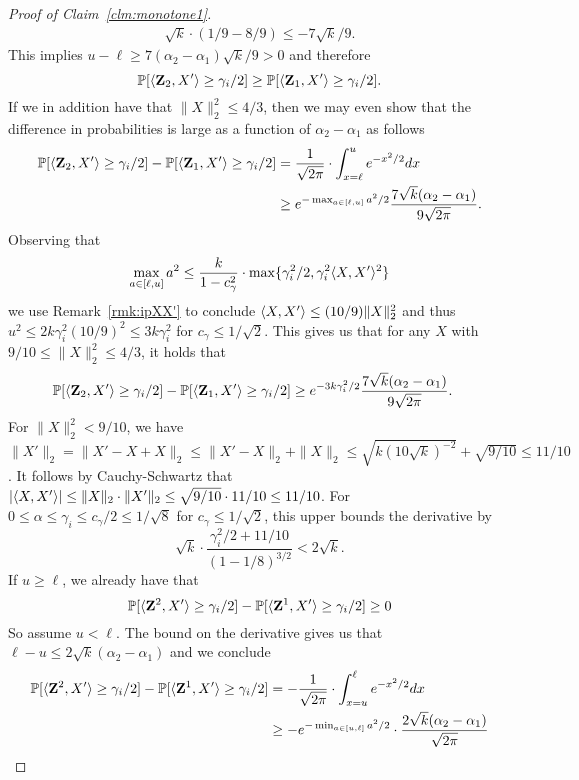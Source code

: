 \begin{proof}[Proof of Claim~\ref{clm:monotone1}]
\begin{align*}
    \sqrt{k} \cdot (1/9 - 8/9) \leq -7\sqrt{k}/9.
\end{align*}
This implies $u - \ell \geq 7(\alpha_2-\alpha_1) \sqrt{k}/9 > 0$ and therefore 
\[
\mathbb{P}[\langle\mathbf{Z}_2,X'\rangle\geq \gamma_i/2] \geq \mathbb{P}[\langle\mathbf{Z}_1,X'\rangle\geq \gamma_i/2].
\]
If we in addition have that $\|X\|_2^2 \leq 4/3$, then we may even show that the difference in probabilities is large as a function of $\alpha_2-\alpha_1$ as follows
\begin{align*}
    \mathbb{P}[\langle\mathbf{Z}_2,X'\rangle\geq \gamma_i/2] - \mathbb{P}[\langle\mathbf{Z}_1,X'\rangle\geq \gamma_i/2] &=\frac{1}{\sqrt{2 \pi}} \cdot \int_{x=\ell}^u e^{-x^2/2} dx \\
    &\geq e^{-\max_{a \in [\ell ,u]} a^2/2} \frac{7 \sqrt{k} (\alpha_2-\alpha_1)}{9 \sqrt{2 \pi}}.
\end{align*}
Observing that
\[
\max_{a \in [\ell, u]} a^2 \leq \frac{k}{1-c_\gamma^2} \cdot \max\{\gamma^2_i/2, \gamma_i^2 \langle X,X'\rangle^2\}
\]
we use Remark~\ref{rmk:ipXX'} to conclude $\langle X,X'\rangle \leq (10/9)\|X\|_2^2$ and thus $u^2 \leq 2k \gamma_i^2 (10/9)^2 \leq 3k \gamma_i^2$ for $c_\gamma \leq 1/\sqrt{2}$. This gives us that for any $X$ with $9/10 \leq \|X\|_2^2 \leq 4/3$, it holds that
\begin{align*}
    \mathbb{P}[\langle\mathbf{Z}_2,X'\rangle\geq \gamma_i/2] - \mathbb{P}[\langle\mathbf{Z}_1,X'\rangle\geq \gamma_i/2] &\geq e^{-3k \gamma_i^2/2} \frac{7 \sqrt{k} (\alpha_2-\alpha_1)}{9 \sqrt{2 \pi}}.
\end{align*}
For $\|X\|_2^2 < 9/10$, we have $\|X'\|_2 = \|X'-X + X\|_2 \leq \|X'-X\|_2 + \|X\|_2 \leq \sqrt{k (10 \sqrt{k})^{-2}} + \sqrt{9/10} \leq 11/10$. It follows by Cauchy-Schwartz that $|\langle X,X'\rangle| \leq \|X\|_2 \cdot \|X'\|_2 \leq \sqrt{9/10} \cdot 11/10 \leq 11/10$. For $0 \leq \alpha \leq \gamma_i \leq c_\gamma/2 \leq 1/\sqrt{8}$ for $c_\gamma \leq 1/\sqrt{2}$, this upper bounds the derivative by
\[
\sqrt{k} \cdot \frac{\gamma_i^2/2 + 11/10}{(1-1/8)^{3/2}} < 2 \sqrt{k}.
\]
If $u \geq \ell$, we already have that 
\[
\mathbb{P}[\langle\mathbf{Z}^2,X'\rangle\geq \gamma_i/2] - \mathbb{P}[\langle\mathbf{Z}^1,X'\rangle\geq \gamma_i/2] \geq 0
\]
So assume $u < \ell$. The bound on the derivative gives us that $\ell-u \leq 2 \sqrt{k} (\alpha_2-\alpha_1)$ and we conclude
\begin{align*}
    \Pr[\ipr{\rZ^2,X'}\geq \gamma_i/2] - \Pr[\ipr{\rZ^1,X'}\geq \gamma_i/2] &=-\frac{1}{\sqrt{2 \pi}} \cdot \int_{x=u}^\ell e^{-x^2/2} dx \\
    &\geq -e^{-\min_{a \in [u,\ell]} a^2/2} \cdot \frac{2 \sqrt{k} (\alpha_2-\alpha_1)}{\sqrt{2 \pi}} \\

\end{align*}
\end{proof}
